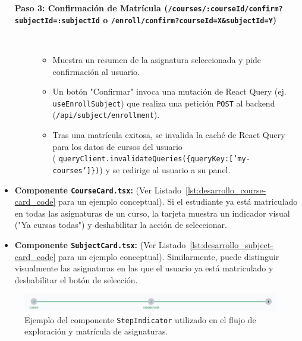 \begin{itemize}[leftmargin=*]
\begin{description}
          \item[\textbf{Paso 3: Confirmación de Matrícula (\texttt{/courses/:courseId/confirm?subjectId=:subjectId} o \texttt{/enroll/confirm?courseId=X\&subjectId=Y})}]\\
            \begin{itemize}[leftmargin=*, labelsep=0.5em]
              \item Muestra un resumen de la asignatura seleccionada y pide confirmación al usuario.
              \item Un botón "Confirmar" invoca una mutación de React Query (ej. \texttt{useEnrollSubject}) que realiza una petición \texttt{POST} al backend (\texttt{/api/subject/enrollment}).
              \item Tras una matrícula exitosa, se invalida la caché de React Query para los datos de cursos del usuario \\ ( \texttt{queryClient.invalidateQueries(\{queryKey:['my-courses']\})}) y se redirige al usuario a su panel.
            \end{itemize}
        \end{description}



  \item \textbf{Componente \texttt{CourseCard.tsx}:} (Ver Listado~\ref{lst:desarrollo_course-card_code} para un ejemplo conceptual). Si el estudiante ya está matriculado en todas las asignaturas de un curso, la tarjeta muestra un indicador visual ("Ya cursas todas") y deshabilitar la acción de seleccionar.

  \item \textbf{Componente \texttt{SubjectCard.tsx}:} (Ver Listado~\ref{lst:desarrollo_subject-card_code} para un ejemplo conceptual). Similarmente, puede distinguir visualmente las asignaturas en las que el usuario ya está matriculado y deshabilitar el botón de selección.
\end{itemize}

\begin{figure}[H]
  \centering
  \includegraphics[width=0.8\linewidth]{Ilustraciones/step_indicator.png}
  \caption{Ejemplo del componente \texttt{StepIndicator} utilizado en el flujo de exploración y matrícula de asignaturas.}
  \label{fig:desarrollo_step-indicator-explore}
\end{figure}


